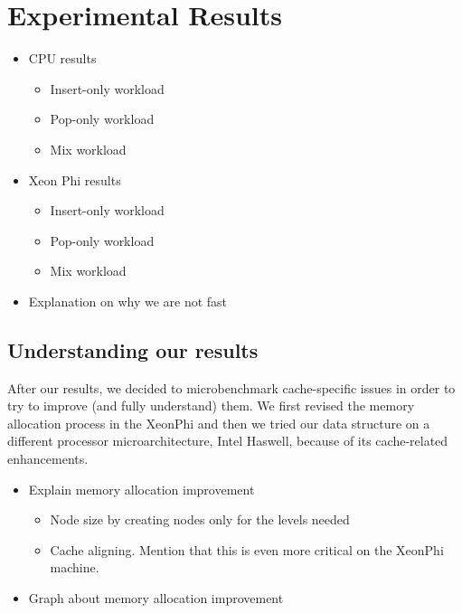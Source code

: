 \section{Experimental Results}
\label{sec:exp}

\begin{itemize}
	\item CPU results
		\begin{itemize}
			\item Insert-only workload
			\item Pop-only workload
			\item Mix workload
		\end{itemize}
	\item Xeon Phi results
		\begin{itemize}
			\item Insert-only workload
			\item Pop-only workload
			\item Mix workload
		\end{itemize}
	\item Explanation on why we are not fast
\end{itemize}

\subsection{Understanding our results}
After our results, we decided to microbenchmark cache-specific issues in order to try to improve (and fully understand) them. We first revised the memory allocation process in the XeonPhi and then we tried our data structure on a different processor microarchitecture, Intel Haswell, because of its cache-related enhancements.

\begin{itemize}
	\item Explain memory allocation improvement
		\begin{itemize}
			\item Node size by creating nodes only for the levels needed
			\item Cache aligning. Mention that this is even more critical on the XeonPhi machine.
		\end{itemize}
	\item Graph about memory allocation improvement
\end{itemize}


